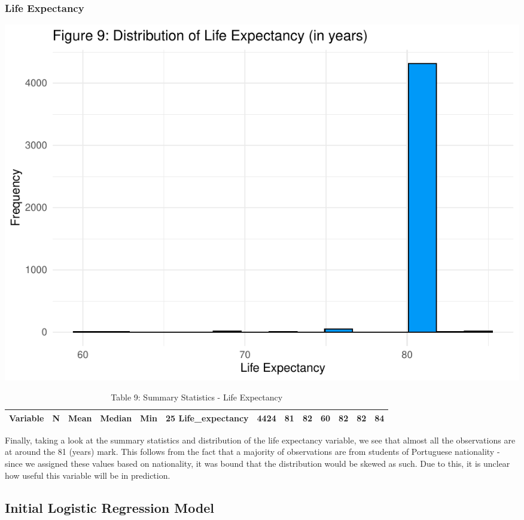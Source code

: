\documentclass[
]{article}
\begin{document}
\hypertarget{life-expectancy}{%
\subsubsection{Life Expectancy}\label{life-expectancy}}

\begin{center}\includegraphics{finalproj_files/figure-latex/unnamed-chunk-15-1} \end{center}

\begin{table}

\caption{\label{tab:unnamed-chunk-15}Table 9: Summary Statistics - Life Expectancy}
\centering
\begin{tabular}[t]{llllllll}
\toprule
Variable & N & Mean & Median & Min & 25%
\midrule
Life_expectancy & 4424 & 81 & 82 & 60 & 82 & 82 & 84\\
\bottomrule
\end{tabular}
\end{table}

Finally, taking a look at the summary statistics and distribution of the
life expectancy variable, we see that almost all the observations are at
around the 81 (years) mark. This follows from the fact that a majority
of observations are from students of Portuguese nationality - since we
assigned these values based on nationality, it was bound that the
distribution would be skewed as such. Due to this, it is unclear how
useful this variable will be in prediction.

\hypertarget{initial-logistic-regression-model}{%
\subsection{Initial Logistic Regression
Model}\label{initial-logistic-regression-model}}
\end{document}
